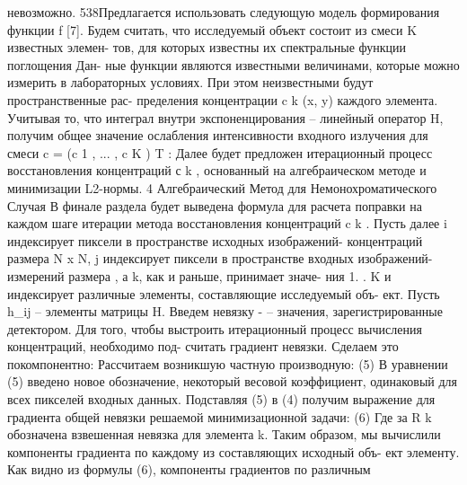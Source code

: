 невозможно.
538Предлагается использовать следующую модель формирования функции f [7].
Будем считать, что исследуемый объект состоит из смеси K известных элемен-
тов, для которых известны их спектральные функции поглощения 
Дан-
ные функции являются известными величинами, которые можно измерить в
лабораторных условиях. При этом неизвестными будут пространственные рас-
пределения концентрации c k (x, y) каждого элемента.
Учитывая то, что интеграл внутри экспоненцирования – линейный оператор H,
получим общее значение ослабления интенсивности входного излучения для
смеси c = (c 1 , ... , c K ) T :
Далее будет предложен итерационный процесс восстановления концентраций
с k , основанный на алгебраическом методе и минимизации L2-нормы.
4
Алгебраический Метод для Немонохроматического
Случая
В финале раздела будет выведена формула для расчета поправки на каждом
шаге итерации метода восстановления концентраций c k .
Пусть далее i индексирует пиксели в пространстве исходных изображений-
концентраций размера N x N, j индексирует пиксели в пространстве входных
изображений-измерений размера %
, а k, как и раньше, принимает значе-
ния 1. . K и индексирует различные элементы, составляющие исследуемый объ-
ект. Пусть h\_ij – элементы матрицы H. Введем невязку -
– значения, зарегистрированные детектором. Для того, чтобы
выстроить итерационный процесс вычисления концентраций, необходимо под-
считать градиент невязки. Сделаем это покомпонентно:
Рассчитаем возникшую частную производную:
(5)
В уравнении (5) введено новое обозначение, некоторый весовой коэффициент,
одинаковый для всех пикселей входных данных. Подставляя (5) в (4) получим
выражение для градиента общей невязки решаемой минимизационной задачи:
(6)
Где за R k обозначена взвешенная невязка для элемента k. Таким образом, мы
вычислили компоненты градиента по каждому из составляющих исходный объ-
ект элементу. Как видно из формулы (6), компоненты градиентов по различным
